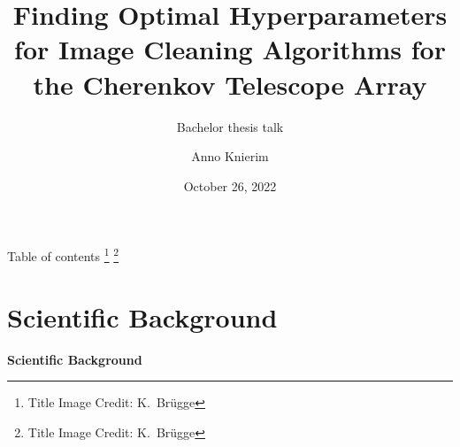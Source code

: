 
 {}
 {\def\theme{-1}}

  {%
  }
  {%
  }



\title{Finding Optimal Hyperparameters for Image Cleaning Algorithms for the Cherenkov Telescope Array}
\subtitle{Bachelor thesis talk}
\author[A.~Knierim]{Anno Knierim}
\date{October 26, 2022}




\maketitle

\begin{frame}[label=title]{Table of contents}
  \tableofcontents
  \vfill
  {%
  \footnote{\textcolor{white!85!black}{Title Image Credit: K.~Br\"{u}gge}}
  }
  {%
  \footnote{\textcolor{darkgray!85!black}{Title Image Credit: K.~Br\"{u}gge}}
  }
\end{frame}


\section{Scientific Background}%
\label{sec:introduction}

\begin{frame}
  \begin{center}
    \textbf{\huge Scientific Background}\\
  \end{center}
\end{frame}



